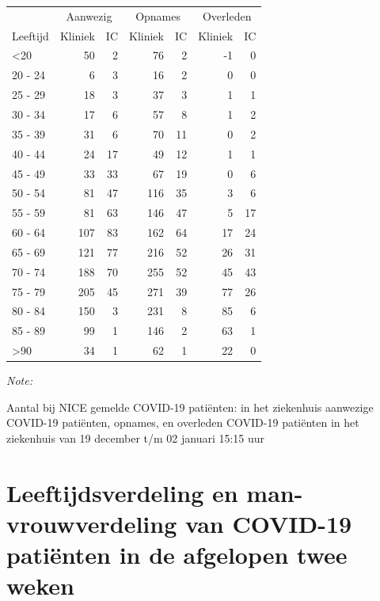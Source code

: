 \documentclass[
  english,
  man,floatsintext]{apa6}
\begin{document}
\begin{table}
\centering\begingroup\fontsize{10}{12}\selectfont

\begin{threeparttable}
\begin{tabular}{lrrrrrr}
\toprule
\multicolumn{1}{c}{ } & \multicolumn{2}{c}{Aanwezig} & \multicolumn{2}{c}{Opnames} & \multicolumn{2}{c}{Overleden} \\
\cmidrule(l{3pt}r{3pt}){2-3} \cmidrule(l{3pt}r{3pt}){4-5} \cmidrule(l{3pt}r{3pt}){6-7}
Leeftijd & Kliniek & IC & Kliniek & IC & Kliniek & IC\\
\midrule
<20 & 50 & 2 & 76 & 2 & -1 & 0\\
20 - 24 & 6 & 3 & 16 & 2 & 0 & 0\\
25 - 29 & 18 & 3 & 37 & 3 & 1 & 1\\
30 - 34 & 17 & 6 & 57 & 8 & 1 & 2\\
35 - 39 & 31 & 6 & 70 & 11 & 0 & 2\\
40 - 44 & 24 & 17 & 49 & 12 & 1 & 1\\
45 - 49 & 33 & 33 & 67 & 19 & 0 & 6\\
50 - 54 & 81 & 47 & 116 & 35 & 3 & 6\\
55 - 59 & 81 & 63 & 146 & 47 & 5 & 17\\
60 - 64 & 107 & 83 & 162 & 64 & 17 & 24\\
65 - 69 & 121 & 77 & 216 & 52 & 26 & 31\\
70 - 74 & 188 & 70 & 255 & 52 & 45 & 43\\
75 - 79 & 205 & 45 & 271 & 39 & 77 & 26\\
80 - 84 & 150 & 3 & 231 & 8 & 85 & 6\\
85 - 89 & 99 & 1 & 146 & 2 & 63 & 1\\
>90 & 34 & 1 & 62 & 1 & 22 & 0\\
\bottomrule
\end{tabular}
\begin{tablenotes}
\item \textit{Note: } 
\item Aantal bij NICE gemelde COVID-19 patiënten: in het ziekenhuis aanwezige COVID-19 patiënten, opnames, en overleden COVID-19 patiënten in het ziekenhuis van 19 december t/m 02 januari 15:15 uur
\end{tablenotes}
\end{threeparttable}
\endgroup{}
\end{table}

\newpage

\hypertarget{leeftijdsverdeling-en-man-vrouwverdeling-van-covid-19-patiuxebnten-in-de-afgelopen-twee-weken}{%
\section{Leeftijdsverdeling en man-vrouwverdeling van COVID-19 patiënten in de afgelopen twee weken}\label{leeftijdsverdeling-en-man-vrouwverdeling-van-covid-19-patiuxebnten-in-de-afgelopen-twee-weken}}
\end{document}
